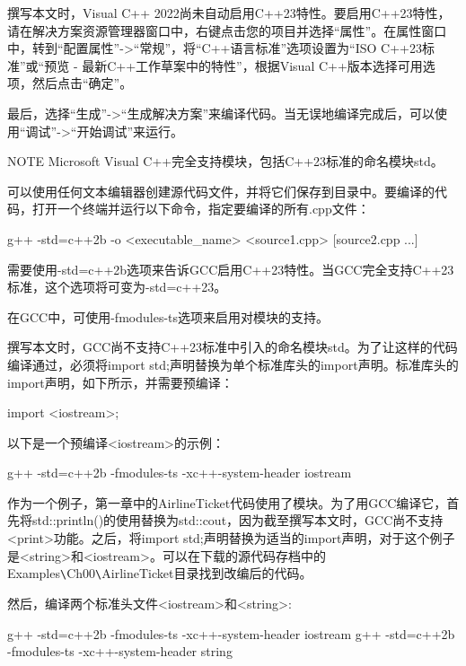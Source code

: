 撰写本文时，Visual C++ 2022尚未自动启用C++23特性。要启用C++23特性，请在解决方案资源管理器窗口中，右键点击您的项目并选择“属性”。在属性窗口中，转到“配置属性”->“常规”，将“C++语言标准”选项设置为“ISO C++23标准”或“预览 - 最新C++工作草案中的特性”，根据Visual C++版本选择可用选项，然后点击“确定”。

最后，选择“生成”->“生成解决方案”来编译代码。当无误地编译完成后，可以使用“调试”->“开始调试”来运行。

\begin{myNotic}{NOTE}
Microsoft Visual C++完全支持模块，包括C++23标准的命名模块std。
\end{myNotic}


可以使用任何文本编辑器创建源代码文件，并将它们保存到目录中。要编译的代码，打开一个终端并运行以下命令，指定要编译的所有.cpp文件：

\begin{shell}
g++ -std=c++2b -o <executable_name> <source1.cpp> [source2.cpp ...]
\end{shell}

需要使用-std=c++2b选项来告诉GCC启用C++23特性。当GCC完全支持C++23标准，这个选项将可变为-std=c++23。


在GCC中，可使用-fmodules-ts选项来启用对模块的支持。

撰写本文时，GCC尚不支持C++23标准中引入的命名模块std。为了让这样的代码编译通过，必须将import std;声明替换为单个标准库头的import声明。标准库头的import声明，如下所示，并需要预编译：

\begin{cpp}
import <iostream>;
\end{cpp}

以下是一个预编译<iostream>的示例：

\begin{shell}
g++ -std=c++2b -fmodules-ts -xc++-system-header iostream
\end{shell}

作为一个例子，第一章中的AirlineTicket代码使用了模块。为了用GCC编译它，首先将std::println()的使用替换为std::cout，因为截至撰写本文时，GCC尚不支持<print>功能。之后，将import std;声明替换为适当的import声明，对于这个例子是<string>和<iostream>。可以在下载的源代码存档中的Examples\verb|\|Ch00\verb|\|AirlineTicket目录找到改编后的代码。

然后，编译两个标准头文件<iostream>和<string>:

\begin{shell}
g++ -std=c++2b -fmodules-ts -xc++-system-header iostream
g++ -std=c++2b -fmodules-ts -xc++-system-header string
\end{shell}


